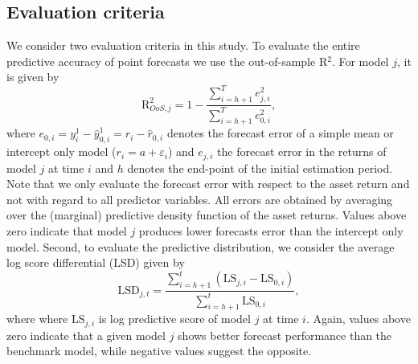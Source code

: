 \subsection{Evaluation criteria}
We consider two evaluation criteria in this study. To evaluate the entire predictive accuracy of point forecasts we use the out-of-sample R$^2$. For model $j$, it is given by
\begin{equation}\label{eqn:R2}
\text{R}^2_{OoS,j}=1-\frac{\sum_{i=h+1}^{T}e_{j,i}^2}{\sum_{i=h+1}^{T}e_{0,i}^2},
\end{equation}
where $e_{0,i}=y_i^1-\hat{y}_{0,i}^1=r_i-\hat{r}_{0,i}$ denotes the forecast error of a simple mean or  intercept only model ($r_i=a+\varepsilon_i$) and $e_{j,i}$ the forecast error in the returns of model $j$ at time $i$ and $h$ denotes the end-point of the initial estimation period. Note that we only evaluate the forecast error with respect to the asset return and not with regard to all predictor variables. All errors are obtained by averaging over the (marginal) predictive density function of the asset returns. Values above zero indicate that model $j$ produces lower forecasts error than the intercept only model. Second, to evaluate the predictive distribution, we consider the average log score differential (LSD) given by
\begin{equation}\label{eqn:LSD}
\text{LSD}_{j,t}=\frac{\sum_{i=h+1}^{t}\left(\text{LS}_{j,i}-\text{LS}_{0,i}\right)}{\sum_{i=h+1}^{t}\text{LS}_{0,i}},
\end{equation}
where where $\text{LS}_{j,i}$ is log predictive score of model $j$ at time $i$. Again, values above zero indicate that a given model $j$ shows better forecast performance than the benchmark model, while negative values suggest the opposite.


